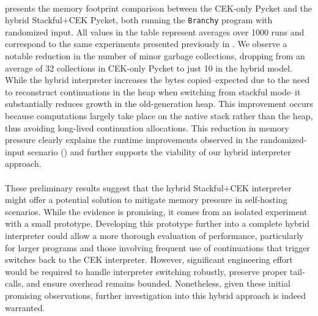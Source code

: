       \paragraph{}%
         presents the memory footprint comparison between the CEK-only Pycket and the hybrid Stackful+CEK Pycket, both running the \texttt{Branchy} program with randomized input. All values in the table represent averages over 1000 runs and correspond to the same experiments presented previously in . We observe a notable reduction in the number of minor garbage collections, dropping from an average of 32 collections in CEK-only Pycket to just 10 in the hybrid model. While the hybrid interpreter increases the bytes copied--expected due to the need to reconstruct continuations in the heap when switching from stackful mode--it substantially reduces growth in the old-generation heap. This improvement occurs because computations largely take place on the native stack rather than the heap, thus avoiding long-lived continuation allocations. This reduction in memory pressure clearly explains the runtime improvements observed in the randomized-input scenario () and further supports the viability of our hybrid interpreter approach.

      \paragraph{}%
        These preliminary results suggest that the hybrid Stackful+CEK interpreter might offer a potential solution to mitigate memory pressure in self-hosting scenarios. While the evidence is promising, it comes from an isolated experiment with a small prototype. Developing this prototype further into a complete hybrid interpreter could allow a more thorough evaluation of performance, particularly for larger programs and those involving frequent use of continuations that trigger switches back to the CEK interpreter. However, significant engineering effort would be required to handle interpreter switching robustly, preserve proper tail-calls, and ensure overhead remains bounded. Nonetheless, given these initial promising observations, further investigation into this hybrid approach is indeed warranted.



